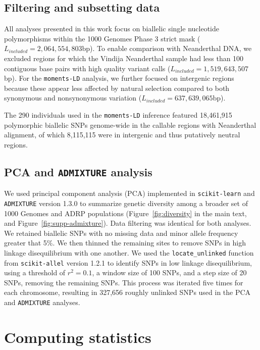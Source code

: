 \documentclass[]{article}
\begin{document}
\subsection{Filtering and subsetting data}\label{sec:filtering}

All analyses presented in this work focus on biallelic single nucleotide
polymorphisms within the 1000 Genomes Phase 3 strict mask
($L_{included}=2,064,554,803$bp). To enable comparison with Neanderthal DNA, we
excluded regions for which the Vindija Neanderthal sample had less than 100
contiguous base pairs with high quality variant calls
($L_{included}=1,519,643,507$bp). For the \texttt{moments-LD} analysis, we
further focused on intergenic regions because these appear less affected by
natural selection compared to both synonymous and nonsynonymous variation
\citep{Ragsdale2018-dd} ($L_{included}=637,639,065$bp). 

The 290 individuals used in the \texttt{moments-LD} inference featured
18,461,915 polymorphic biallelic SNPs genome-wide in the callable regions with
Neanderthal alignment, of which 8,115,115 were in intergenic and thus
putatively neutral regions. 

\subsection{PCA and \texttt{ADMIXTURE} analysis}\label{sec:dimred}

We used principal component analysis (PCA) implemented in \texttt{scikit-learn}
\citep{Pedregosa2011-ke} and \texttt{ADMIXTURE} version 1.3.0
\citep{Alexander2011-aq} to summarize genetic diversity among a broader set of
1000 Genomes and ADRP populations (Figure~\ref{fig:diversity} in the main text,
and Figure~\ref{fig:supp-admixture}). Data
filtering was identical for both analyses. We retained biallelic SNPs with no
missing data and minor allele frequency greater that 5\%. We then thinned the
remaining sites to remove SNPs in high linkage disequilibrium with one another.
We used the \texttt{locate\_unlinked} function from \texttt{scikit-allel}
version 1.2.1 \citep{Miles2021-yq} to identify SNPs in low linkage
disequilibrium, using a threshold of $r^2=0.1$, a window size of 100 SNPs, and
a step size of 20 SNPs, removing the remaining SNPs. This process was iterated
five times for each chromosome, resulting in 327,656 roughly unlinked SNPs used
in the PCA and \texttt{ADMIXTURE} analyses.

\section{Computing statistics}
\end{document}

